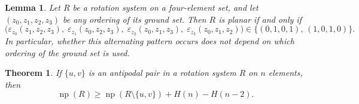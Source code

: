 \documentclass[10pt,a4paper]{amsart}
\newtheorem{theorem}{Theorem}
\newtheorem{lemma}{Lemma}
\newcommand{\np}{\operatorname{np}}
\begin{document}
\begin{lemma}\label{planar}
Let \(R\) be a rotation system on a four-element set, and let
\((z_0,z_1,z_2,z_3)\) be any ordering of its ground set.  Then \(R\) is
planar if and only if
\begin{equation}\label{eq:planar-orientations}
\bigl(\varepsilon_{z_0}(z_1,z_2,z_3),\;
      \varepsilon_{z_1}(z_0,z_2,z_3),\;
      \varepsilon_{z_2}(z_0,z_1,z_3),\;
      \varepsilon_{z_3}(z_0,z_1,z_2)\bigr)
\in\bigl\{(0,1,0,1),\,(1,0,1,0)\bigr\}.
\end{equation}
In particular, whether this alternating pattern occurs does not depend
on which ordering of the ground set is used.
\end{lemma}

\begin{theorem}\label{thm:antipodal}
If \(\{u,v\}\) is an antipodal pair in a rotation system \(R\) on
\(n\) elements, then
\[
\np(R)\geq \np(R\setminus\{u,v\})+H(n)-H(n-2).
\]
\end{theorem}
\end{document}
